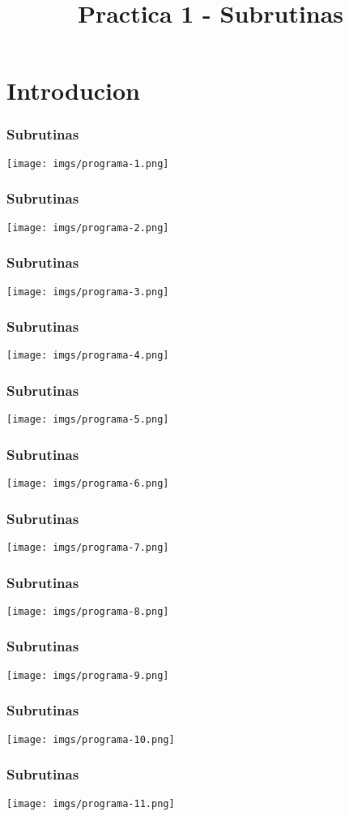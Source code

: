 \documentclass{beamer}
\title{Practica 1 - Subrutinas}
\begin{document}
\begin{frame}
\titlepage
\end{frame}

\section{Introducion}

\begin{frame}
\frametitle{Subrutinas}
\texttt{[image: imgs/programa-1.png]}
\end{frame}

\begin{frame}
\frametitle{Subrutinas}
\texttt{[image: imgs/programa-2.png]}
\end{frame}

\begin{frame}
\frametitle{Subrutinas}
\texttt{[image: imgs/programa-3.png]}
\end{frame}

\begin{frame}
\frametitle{Subrutinas}
\texttt{[image: imgs/programa-4.png]}
\end{frame}

\begin{frame}
\frametitle{Subrutinas}
\texttt{[image: imgs/programa-5.png]}
\end{frame}

\begin{frame}
\frametitle{Subrutinas}
\texttt{[image: imgs/programa-6.png]}
\end{frame}
\begin{frame}
\frametitle{Subrutinas}
\texttt{[image: imgs/programa-7.png]}
\end{frame}
\begin{frame}
\frametitle{Subrutinas}
\texttt{[image: imgs/programa-8.png]}
\end{frame}
\begin{frame}
\frametitle{Subrutinas}
\texttt{[image: imgs/programa-9.png]}
\end{frame}
\begin{frame}
\frametitle{Subrutinas}
\texttt{[image: imgs/programa-10.png]}
\end{frame}

\begin{frame}
\frametitle{Subrutinas}
\texttt{[image: imgs/programa-11.png]}
\end{frame}
\end{document}
